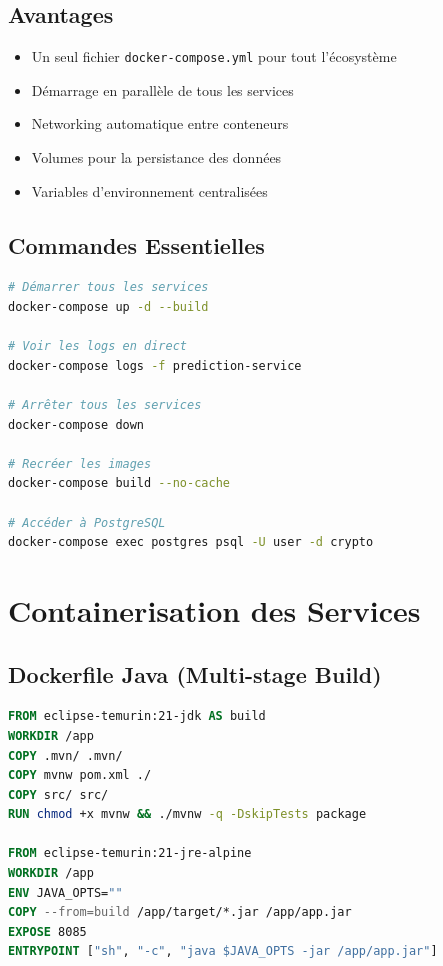 \documentclass[12pt,a4paper,twoside]{report}
\begin{document}
\subsection{Avantages}
\begin{itemize}
    \item Un seul fichier \texttt{docker-compose.yml} pour tout l'écosystème
    \item Démarrage en parallèle de tous les services
    \item Networking automatique entre conteneurs
    \item Volumes pour la persistance des données
    \item Variables d'environnement centralisées
\end{itemize}

\subsection{Commandes Essentielles}

\begin{lstlisting}[language=bash]
# Démarrer tous les services
docker-compose up -d --build

# Voir les logs en direct
docker-compose logs -f prediction-service

# Arrêter tous les services
docker-compose down

# Recréer les images
docker-compose build --no-cache

# Accéder à PostgreSQL
docker-compose exec postgres psql -U user -d crypto
\end{lstlisting}

\section{Containerisation des Services}

\subsection{Dockerfile Java (Multi-stage Build)}

\begin{lstlisting}[language=dockerfile]
FROM eclipse-temurin:21-jdk AS build
WORKDIR /app
COPY .mvn/ .mvn/
COPY mvnw pom.xml ./
COPY src/ src/
RUN chmod +x mvnw && ./mvnw -q -DskipTests package

FROM eclipse-temurin:21-jre-alpine
WORKDIR /app
ENV JAVA_OPTS=""
COPY --from=build /app/target/*.jar /app/app.jar
EXPOSE 8085
ENTRYPOINT ["sh", "-c", "java $JAVA_OPTS -jar /app/app.jar"]
\end{lstlisting}
\end{document}
